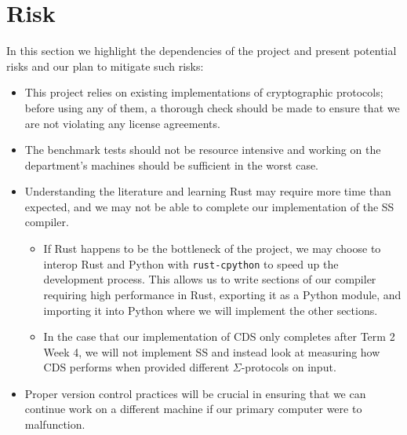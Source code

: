 \section{Risk}
In this section we highlight the dependencies of the project and present potential risks and our plan to mitigate such risks:
\begin{itemize}
    \item This project relies on existing implementations of cryptographic protocols; before using any of them, a thorough check should be made to ensure that we are not violating any license agreements.
    \item The benchmark tests should not be resource intensive and working on the department's machines should be sufficient in the worst case. 
    \item Understanding the literature and learning Rust may require more time than expected, and we may not be able to complete our implementation of the SS compiler.
    \begin{itemize}
        \item If Rust happens to be the bottleneck of the project, we may choose to interop Rust and Python with \texttt{rust-cpython} to speed up the development process. This allows us to write sections of our compiler requiring high performance in Rust, exporting it as a Python module, and importing it into Python where we will implement the other sections.
        \item In the case that our implementation of CDS only completes after Term 2 Week 4, we will not implement SS and instead look at measuring how CDS performs when provided different $\Sigma$-protocols on input.
    \end{itemize}
    \item Proper version control practices will be crucial in ensuring that we can continue work on a different machine if our primary computer were to malfunction.
\end{itemize}
 




